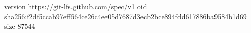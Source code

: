 version https://git-lfs.github.com/spec/v1
oid sha256:f2df5ccab97eff664ce26c4ee05d7687d3ecb2bce894fdd617886ba9584b1d69
size 87544
